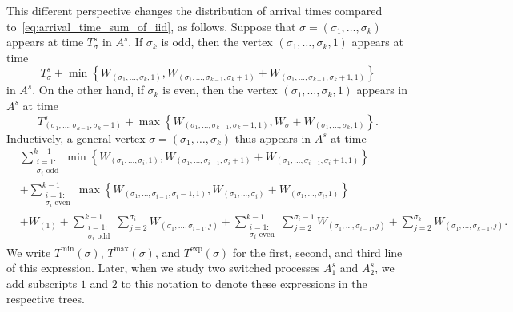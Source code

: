 \documentclass[11pt]{article}
\numberwithin{equation}{section}
\theoremstyle{definition}
\begin{document}
This different perspective changes the distribution of arrival times compared to~\eqref{eq:arrival_time_sum_of_iid}, as follows.  
Suppose that $\sigma = (\sigma_{1}, \ldots, \sigma_{k})$ appears at time $T_{\sigma}^{s}$ in $A^{s}$. 
If $\sigma_{k}$ is odd, 
then the vertex $(\sigma_{1}, \ldots, \sigma_{k},1)$ appears at time 
\[
T_{\sigma}^{s} + \min \left\{ W_{(\sigma_{1}, \ldots, \sigma_{k},1)}, W_{(\sigma_{1}, \ldots, \sigma_{k-1}, \sigma_{k}+1)} + W_{(\sigma_{1}, \ldots, \sigma_{k-1}, \sigma_{k}+1,1)} \right\}
\]
in $A^{s}$. 
On the other hand, if $\sigma_{k}$ is even, 
then the vertex $(\sigma_{1}, \ldots, \sigma_{k},1)$ appears in $A^{s}$ at time 
\[
T_{(\sigma_{1}, \ldots, \sigma_{k-1}, \sigma_{k}-1)}^{s} + \max \left\{ W_{(\sigma_{1}, \ldots, \sigma_{k-1}, \sigma_{k}-1,1)}, W_{\sigma} + W_{(\sigma_{1}, \ldots, \sigma_{k},1)} \right\}.
\]
Inductively, a general vertex 
$\sigma = (\sigma_{1}, \ldots, \sigma_{k})$ thus appears in $A^{s}$ at time 
\begin{align}
    &  
    \sum_{\substack{i=1: \\ \sigma_{i} \text{ odd}}}^{k-1} \min \left\{ W_{(\sigma_1,\ldots,\sigma_i,1)} , W_{(\sigma_1,\ldots, \sigma_{i-1}, \sigma_i + 1 )} + W_{(\sigma_1,\ldots, \sigma_{i-1}, \sigma_i + 1, 1)} \right\}\label{eq:Tmin}\\
    &
    +
    \sum_{\substack{i=1: \\ \sigma_{i} \text{ even}}}^{k-1} \max \left\{ W_{(\sigma_1,\ldots, \sigma_{i-1}, \sigma_{i} - 1,1)} , W_{(\sigma_1,\ldots,\sigma_i  )} + W_{(\sigma_1,\ldots,\sigma_i, 1)} \right\}\label{eq:Tmax}\\
    & + W_{(1)} 
    +
    \sum_{\substack{i=1: \\ \sigma_{i} \text{ odd}}}^{k-1} \sum_{j=2}^{\sigma_i} W_{(\sigma_1,\ldots,\sigma_{i-1},j)}
    +
    \sum_{\substack{i=1: \\ \sigma_{i} \text{ even}}}^{k-1} \sum_{j=2}^{\sigma_i-1} W_{(\sigma_1,\ldots,\sigma_{i-1},j)}
    +
    \sum_{j=2}^{\sigma_k} W_{(\sigma_1,\ldots,\sigma_{k-1},j)}.\label{eq:Texp}
\end{align}
We write $T^{\min}(\sigma)$, $T^{\max}(\sigma)$, and $T^{\exp}(\sigma)$ for the first, second, and third line of this expression. 
Later, when we study two switched processes $A_{1}^{s}$ and $A_{2}^{s}$, 
we add subscripts $1$ and $2$ to this notation to denote these expressions in the respective trees. 
\end{document}
